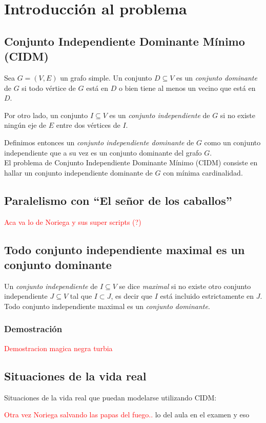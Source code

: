 \section{Introducci\'on al problema}
\subsection{Conjunto Independiente Dominante M\'inimo (CIDM)}

Sea $G = (V, E)$ un grafo simple. Un conjunto $D \subseteq V$ es un \emph{conjunto dominante} de $G$ si todo v\'ertice de $G$ est\'a en $D$ o bien tiene al menos un vecino que est\'a en $D$. 

Por otro lado, un conjunto $I \subseteq V$ es un \emph{conjunto independiente} de $G$ si no existe ning\'un eje de $E$ entre dos v\'ertices de $I$. 

Definimos entonces un \emph{conjunto independiente dominante} de $G$ como un conjunto independiente que a su vez es un conjunto dominante del grafo $G$.\\

El problema de Conjunto Independiente Dominante M\'inimo (CIDM) consiste en hallar un conjunto independiente dominante de $G$ con m\'inima cardinalidad.

\subsection{Paralelismo con ``El se\~nor de los caballos''}

\textcolor{red}{Aca va lo de Noriega y sus super scripts (?)}

\subsection{Todo conjunto independiente maximal es un conjunto dominante}

 Un \emph{conjunto independiente} de $I \subseteq V$ se dice \emph{maximal} si no existe otro conjunto independiente $J \subseteq V$ tal que $I \subset J$, es decir que $I$ est\'a incluido estrictamente en $J$. Todo conjunto independiente maximal es un \emph{conjunto dominante}.
 
\subsubsection*{Demostraci\'on}

\textcolor{red}{Demostracion magica negra turbia}

\subsection{Situaciones de la vida real}

Situaciones de la vida real que puedan modelarse utilizando CIDM:

\textcolor{red}{Otra vez Noriega salvando las papas del fuego..} lo del aula en el examen y eso